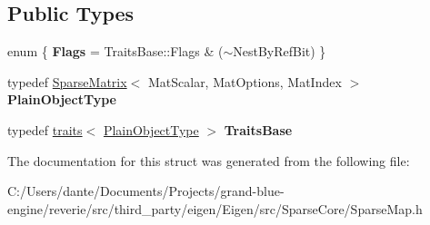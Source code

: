\subsection*{Public Types}
\begin{DoxyCompactItemize}
\item 
\mbox{\label{struct_eigen_1_1internal_1_1traits_3_01_map_3_01_sparse_matrix_3_01_mat_scalar_00_01_mat_optionsc906e4e1b3a968ac003455586a92664c_adf7a5efed56a5680108d973d8f4f0831}} 
enum \{ {\bfseries Flags} = Traits\+Base\+::Flags \& ($\sim$\+Nest\+By\+Ref\+Bit)
 \}
\item 
\mbox{\label{struct_eigen_1_1internal_1_1traits_3_01_map_3_01_sparse_matrix_3_01_mat_scalar_00_01_mat_optionsc906e4e1b3a968ac003455586a92664c_a7ea1289147e8e15383731b2ca4ef5dee}} 
typedef \mbox{\hyperlink{class_eigen_1_1_sparse_matrix}{Sparse\+Matrix}}$<$ Mat\+Scalar, Mat\+Options, Mat\+Index $>$ {\bfseries Plain\+Object\+Type}
\item 
\mbox{\label{struct_eigen_1_1internal_1_1traits_3_01_map_3_01_sparse_matrix_3_01_mat_scalar_00_01_mat_optionsc906e4e1b3a968ac003455586a92664c_a515426d8fed72750e4815acd12da5aa0}} 
typedef \mbox{\hyperlink{struct_eigen_1_1internal_1_1traits}{traits}}$<$ \mbox{\hyperlink{class_eigen_1_1_sparse_matrix}{Plain\+Object\+Type}} $>$ {\bfseries Traits\+Base}
\end{DoxyCompactItemize}


The documentation for this struct was generated from the following file\+:\begin{DoxyCompactItemize}
\item 
C\+:/\+Users/dante/\+Documents/\+Projects/grand-\/blue-\/engine/reverie/src/third\+\_\+party/eigen/\+Eigen/src/\+Sparse\+Core/Sparse\+Map.\+h\end{DoxyCompactItemize}
